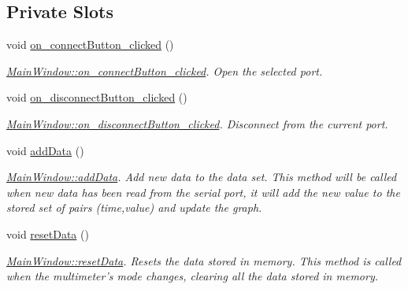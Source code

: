 \subsection*{Private Slots}
\begin{DoxyCompactItemize}
\item 
void \hyperlink{class_main_window_a55cd52e7b00aff669290588f8affea5a}{on\-\_\-connect\-Button\-\_\-clicked} ()
\begin{DoxyCompactList}\small\item\em \hyperlink{class_main_window_a55cd52e7b00aff669290588f8affea5a}{Main\-Window\-::on\-\_\-connect\-Button\-\_\-clicked}. Open the selected port. \end{DoxyCompactList}\item 
void \hyperlink{class_main_window_ab9336d803a096e94955e032ecf9d0e8b}{on\-\_\-disconnect\-Button\-\_\-clicked} ()
\begin{DoxyCompactList}\small\item\em \hyperlink{class_main_window_ab9336d803a096e94955e032ecf9d0e8b}{Main\-Window\-::on\-\_\-disconnect\-Button\-\_\-clicked}. Disconnect from the current port. \end{DoxyCompactList}\item 
void \hyperlink{class_main_window_a7208eaab614587a945fee7216034aa71}{add\-Data} ()
\begin{DoxyCompactList}\small\item\em \hyperlink{class_main_window_a7208eaab614587a945fee7216034aa71}{Main\-Window\-::add\-Data}. Add new data to the data set. This method will be called when new data has been read from the serial port, it will add the new value to the stored set of pairs (time,value) and update the graph. \end{DoxyCompactList}\item 
void \hyperlink{class_main_window_ac9a5649007c5a18e7aa123634866e3a7}{reset\-Data} ()
\begin{DoxyCompactList}\small\item\em \hyperlink{class_main_window_ac9a5649007c5a18e7aa123634866e3a7}{Main\-Window\-::reset\-Data}. Resets the data stored in memory. This method is called when the multimeter's mode changes, clearing all the data stored in memory. \end{DoxyCompactList}\end{DoxyCompactItemize}
